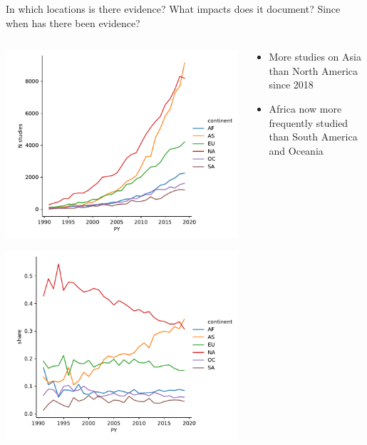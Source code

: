 \documentclass[9pt]{beamer}
\begin{document}
\begin{frame}{In which locations is there evidence? What impacts does it document? Since when has there been evidence?}

\begin{columns}
	\begin{column}{0.382\linewidth}
		\includegraphics[width=\linewidth]{../plots/literature_distribution/PY_continent_n.pdf}
		
		\includegraphics[width=\linewidth]{../plots/literature_distribution/PY_continent_shares.pdf}
	\end{column}
	\begin{column}{0.618\linewidth}
		\begin{itemize}
			\item More studies on Asia than North America since 2018
			\item Africa now more frequently studied than South America and Oceania
			
		\end{itemize}
	\end{column}
\end{columns}

\end{frame}
\end{document}
